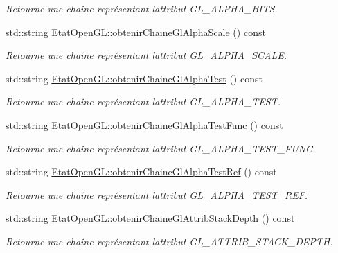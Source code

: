 \begin{DoxyCompactItemize}
\begin{DoxyCompactList}\small\item\em Retourne une chaîne représentant l\textquotesingle{}attribut G\+L\+\_\+\+A\+L\+P\+H\+A\+\_\+\+B\+I\+T\+S. \end{DoxyCompactList}\item 
std\+::string \hyperlink{group__utilitaire_ga3b85b93cd7e5d1f12a225f28ece00696}{Etat\+Open\+G\+L\+::obtenir\+Chaine\+Gl\+Alpha\+Scale} () const 
\begin{DoxyCompactList}\small\item\em Retourne une chaîne représentant l\textquotesingle{}attribut G\+L\+\_\+\+A\+L\+P\+H\+A\+\_\+\+S\+C\+A\+L\+E. \end{DoxyCompactList}\item 
std\+::string \hyperlink{group__utilitaire_ga9fd2e2270997cf027e38f6a7b8d621a8}{Etat\+Open\+G\+L\+::obtenir\+Chaine\+Gl\+Alpha\+Test} () const 
\begin{DoxyCompactList}\small\item\em Retourne une chaîne représentant l\textquotesingle{}attribut G\+L\+\_\+\+A\+L\+P\+H\+A\+\_\+\+T\+E\+S\+T. \end{DoxyCompactList}\item 
std\+::string \hyperlink{group__utilitaire_ga5002fd87fb9aede24afc4c4bb2a61fb1}{Etat\+Open\+G\+L\+::obtenir\+Chaine\+Gl\+Alpha\+Test\+Func} () const 
\begin{DoxyCompactList}\small\item\em Retourne une chaîne représentant l\textquotesingle{}attribut G\+L\+\_\+\+A\+L\+P\+H\+A\+\_\+\+T\+E\+S\+T\+\_\+\+F\+U\+N\+C. \end{DoxyCompactList}\item 
std\+::string \hyperlink{group__utilitaire_gacc2904dcf7edec91f24e5e6ea58a780c}{Etat\+Open\+G\+L\+::obtenir\+Chaine\+Gl\+Alpha\+Test\+Ref} () const 
\begin{DoxyCompactList}\small\item\em Retourne une chaîne représentant l\textquotesingle{}attribut G\+L\+\_\+\+A\+L\+P\+H\+A\+\_\+\+T\+E\+S\+T\+\_\+\+R\+E\+F. \end{DoxyCompactList}\item 
std\+::string \hyperlink{group__utilitaire_ga59c1e206aa477f625b5499cf328f695b}{Etat\+Open\+G\+L\+::obtenir\+Chaine\+Gl\+Attrib\+Stack\+Depth} () const 
\begin{DoxyCompactList}\small\item\em Retourne une chaîne représentant l\textquotesingle{}attribut G\+L\+\_\+\+A\+T\+T\+R\+I\+B\+\_\+\+S\+T\+A\+C\+K\+\_\+\+D\+E\+P\+T\+H. \end{DoxyCompactList}\item 

\end{DoxyCompactItemize}
